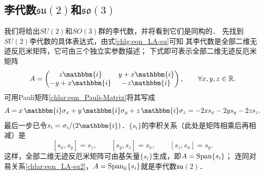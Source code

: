 \subsection{李代数$\mathfrak{su}(2)$和$\mathfrak{so}(3)$}\label{chlar:sec_LA-su2so3}
我们将给出$SU(2)$和$SO(3)$群的李代数，并将看到它们是同构的．
先找到$SU(2)$李代数的具体表达式，由式\eqref{chlg:eqn_LA-su}可知
其李代数是全部二维无迹反厄米矩阵，它可由三个独立实参数描述；
下式即可表示全部二维无迹反厄米矩阵
\begin{equation}
    A=\begin{pmatrix}  z\mathbbm{i} & y+x\mathbbm{i} \\ -y+x \mathbbm{i}  & -z\mathbbm{i} \end{pmatrix},
    \qquad \forall x,y,z\in \mathbb{R} .
\end{equation}
可用Pauli矩阵\eqref{chlar:eqn_Pauli-Matrix}将其写成
\begin{equation}
    A= x \, \mathbbm{i} \sigma_x + y \, \mathbbm{i} \sigma_y + z \, \mathbbm{i} \sigma_z 
     = -2 x s_x -2 y s_y -2 z s_z .
\end{equation}
最后一步已令$s_i=\sigma_i/(2\mathbbm{i})$．$\{s_i\}$的李积关系（此处是矩阵相乘后再相减）是
\begin{equation}\label{chlar:eqn_LA-su2}
    [s_x, s_y]=s_z, \qquad
    [s_y, s_z]=s_x, \qquad
    [s_z, s_x]=s_y .
\end{equation}
这样，全部二维无迹反厄米矩阵可由基矢量$\{s_i\}$生成，即$A={\rm Span}\{s_i\}$；
连同对易关系\eqref{chlar:eqn_LA-su2}，$A={\rm Span}_{\mathbb{R}}\{s_i\}$就是李代数$\mathfrak{su}(2)$．

